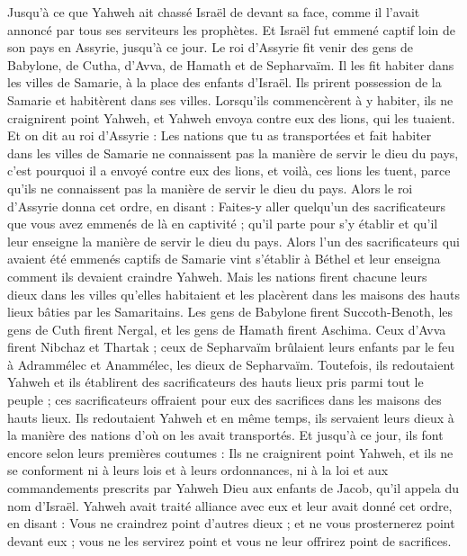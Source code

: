 \begin{multicols}{2}
Jusqu'à ce que Yahweh ait chassé Israël de devant sa face, comme il l'avait annoncé par tous ses serviteurs les prophètes. Et Israël fut emmené captif loin de son pays en Assyrie, jusqu'à ce jour.
Le roi d'Assyrie fit venir des gens de Babylone, de Cutha, d'Avva, de Hamath et de Sepharvaïm. Il les fit habiter dans les villes de Samarie, à la place des enfants d'Israël. Ils prirent possession de la Samarie  et habitèrent dans ses villes.
Lorsqu'ils commencèrent à y habiter, ils ne craignirent point Yahweh, et Yahweh envoya contre eux des lions, qui les tuaient.
Et on dit au roi d'Assyrie : Les nations que tu as transportées et fait habiter dans les villes de Samarie ne connaissent pas la manière de servir le dieu du pays, c'est pourquoi il a envoyé contre eux des lions, et voilà, ces lions les tuent, parce qu'ils ne connaissent pas la manière de servir le dieu du pays.
Alors le roi d'Assyrie donna cet ordre, en disant : Faites-y aller quelqu'un des sacrificateurs que vous avez emmenés de là en captivité ; qu'il parte pour s'y établir et qu'il leur enseigne la manière de servir le dieu du pays.
Alors l'un des sacrificateurs qui avaient été emmenés captifs de Samarie vint s'établir à Béthel  et leur enseigna comment ils devaient craindre Yahweh.
Mais les nations firent chacune leurs dieux dans les villes qu'elles habitaient et les placèrent dans les maisons des hauts lieux bâties par les Samaritains.
Les gens de Babylone firent Succoth-Benoth, les gens de Cuth firent Nergal, et les gens de Hamath firent Aschima.
Ceux d'Avva firent Nibchaz et Thartak ; ceux de Sepharvaïm brûlaient leurs enfants par le feu à Adrammélec et Anammélec, les dieux de Sepharvaïm.
Toutefois, ils redoutaient Yahweh et ils établirent des sacrificateurs des hauts lieux pris parmi tout le peuple ; ces sacrificateurs offraient pour eux des sacrifices dans les maisons des hauts lieux.
Ils redoutaient Yahweh et en même temps, ils servaient leurs dieux à la manière des nations d'où on les avait transportés.
Et jusqu'à ce jour, ils font encore selon leurs premières coutumes : Ils ne craignirent point Yahweh, et ils ne se conforment ni à leurs lois et à leurs ordonnances, ni à la loi et aux commandements prescrits par Yahweh Dieu aux enfants de Jacob, qu'il appela du nom d'Israël.
Yahweh avait traité alliance avec eux et leur avait donné cet ordre, en disant : Vous ne craindrez point d'autres dieux ; et ne vous prosternerez point devant eux ; vous ne les servirez point et vous ne leur offrirez point de sacrifices.

\end{multicols}
